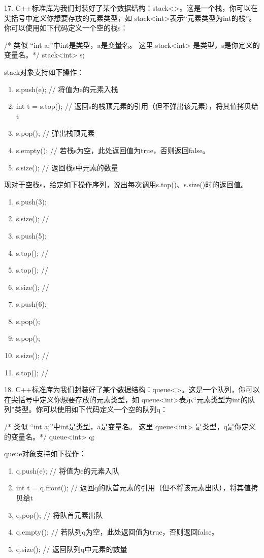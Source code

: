 \begin{exercise}
    17. C++标准库为我们封装好了某个数据结构：stack<>。这是一个栈，你可以在尖括号中定义你想要存放的元素类型，如
stack<int>表示“元素类型为int的栈”。你可以使用如下代码定义一个空的栈s：
\begin{cppcode}
/* 类似 “int a;”中int是类型，a是变量名。
    这里 stack<int> 是类型，s是你定义的变量名。*/
    stack<int> s;   
\end{cppcode}
stack对象支持如下操作：
\begin{enumerate}[label=\arabic*）]
    \item s.push(e);    // 将值为e的元素入栈
    \item int t = s.top();      // 返回s的栈顶元素的引用（但不弹出该元素），将其值拷贝给t
    \item s.pop();      // 弹出栈顶元素
    \item s.empty();    // 若栈s为空，此处返回值为true，否则返回false。
    \item s.size();     // 返回栈s中元素的数量
\end{enumerate}
现对于空栈s，给定如下操作序列，说出每次调用s.top()、s.size()时的返回值。
\begin{enumerate}[label=\arabic*）]
    \item s.push(3);
    \item s.size(); // 
    \item s.push(5);
    \item s.top();  // 
    \item s.top();  // 
    \item s.size(); // 
    \item s.push(6);
    \item s.pop();
    \item s.pop();
    \item s.size(); // 
    \item s.top();  // 
\end{enumerate}

\vspace{\baselineskip}

    18. C++标准库为我们封装好了某个数据结构：queue<>。这是一个队列，你可以在尖括号中定义你想要存放的元素类型，如
queue<int>表示“元素类型为int的队列”类型。你可以使用如下代码定义一个空的队列q：
\begin{cppcode}
/* 类似 “int a;”中int是类型，a是变量名。
    这里 queue<int> 是类型，q是你定义的变量名。*/
    queue<int> q;   
\end{cppcode}
queue对象支持如下操作：
\begin{enumerate}[label=\arabic*）]
    \item q.push(e);    // 将值为e的元素入队
    \item int t = q.front();      // 返回q的队首元素的引用（但不将该元素出队），将其值拷贝给t
    \item q.pop();      // 将队首元素出队
    \item q.empty();    // 若队列q为空，此处返回值为true，否则返回false。
    \item q.size();     // 返回队列q中元素的数量
\end{enumerate}


\end{exercise}
